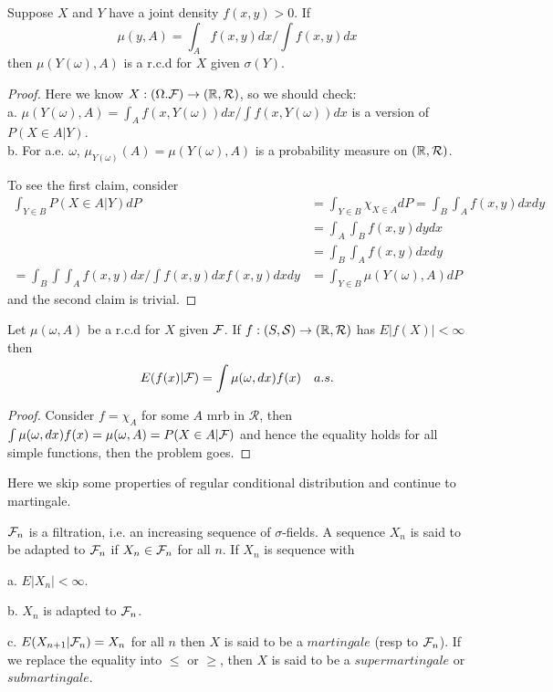 \begin{proposition}
    Suppose $X$ and $Y$ have a joint density $f(x,y)>0$. If
    \[\mu(y,A) = \int_A f(x,y)dx/\int f(x,y)dx\]
    then $\mu(Y(\omega),A)$ is a r.c.d for $X$ given $\sigma(Y)$.
\end{proposition}
\begin{proof}\par
    Here we know $X:(\Omega.\mathcal{F}) \to (\mathbb{R},\mathcal{R})$, so we should check:\\
    a. $\mu(Y(\omega), A) = \int_A f(x,Y(\omega))dx/\int f(x,Y(\omega))dx$ is a version of $P(X\in A|Y)$.\\
    b. For a.e. $\omega$, $\mu_{Y(\omega)}(A) = \mu(Y(\omega),A)$ is a probability measure on $(\mathbb{R},\mathcal{R})$.\par
    To see the first claim, consider
    \[
    \begin{aligned}
    \int_{Y\in B} P(X\in A|Y) dP &= \int_{Y\in B} \chi_{X\in A} dP = \int_B\int_A f(x,y)dxdy \\&= \int_A \int_B f(x,y)dy dx \\
    & = \int_B \int_A f(x,y)dx dy \\
    =\int_B \int \int_A f(x,y) dx / \int f(x,y)dx f(x,y) dx dy 
    &= \int_{Y\in B} \mu(Y(\omega), A) dP
    \end{aligned}
    \]
    and the second claim is trivial.
\end{proof}
\begin{theorem}
    Let $\mu(\omega,A)$ be a r.c.d for $X$ given $\mathcal{F}$. If $f:(S,\mathcal{S}) \to (\mathbb{R},\mathcal{R})$ has $E|f(X)|<\infty$ then
    \[E(f(x)|\mathcal{F}) = \int \mu(\omega,dx)f(x)\quad a.s.\]
\end{theorem}
\begin{proof}\par
    Consider $f= \chi_A$ for some $A$ mrb in $\mathcal{R}$, then $\int \mu(\omega, dx)f(x) = \mu(\omega, A) = P(X\in A|\mathcal{F})$
    and hence the equality holds for all simple functions, then the problem goes.\par
\end{proof}

Here we skip some properties of regular conditional distribution and continue to martingale.\par

\begin{definition}
    $\mathcal{F}_n$ is a filtration, i.e. an increasing sequence of $\sigma$-fields. A sequence $X_n$ is said to be adapted to $\mathcal{F}_n$ if $X_n\in\mathcal{F}_n$ for all $n$. If $X_n$ is sequence with\par
    a. $E|X_n| < \infty$.\par
    b. $X_n$ is adapted to $\mathcal{F}_n$.\par
    c. $E(X_{n+1}|\mathcal{F}_n) = X_n$ for all $n$
    then $X$ is said to be a $martingale$ (resp to $\mathcal{F}_n$). If we replace the equality into $\leq$ or $\geq$, then $X$ is said to be a $supermartingale$ or $submartingale$.\par 
\end{definition}

